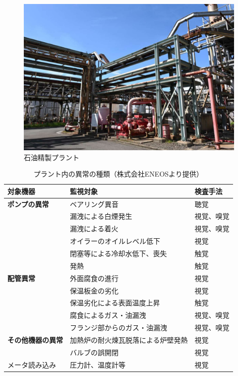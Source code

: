 \documentclass[../main]{subfiles}
\begin{document}
\begin{figure}[t]
  \centering
  \includegraphics[keepaspectratio, width=0.8\linewidth]{chap1/view_plant.png}
  \caption{石油精製プラント}
  \label{fig:view_plant}
\end{figure}


\begin{table}[t]
  \caption{プラント内の異常の種類（株式会社ENEOSより提供）}
  \label{tab:plant_anomalies}
  \centering
  \begin{tabular}{lll}
    \toprule
    対象機器 & 監視対象 & 検査手法 \\
    \midrule
    \textbf{ポンプの異常} & ベアリング異音 & 聴覚 \\
                 & 漏洩による白煙発生 & 視覚、嗅覚 \\
                 & 漏洩による着火 & 視覚、嗅覚 \\
                 & オイラーのオイルレベル低下 & 視覚 \\
                 & 閉塞等による冷却水低下、喪失 & 触覚 \\
                 & 発熱 & 触覚 \\
    \midrule
    \textbf{配管異常} & 外面腐食の進行 & 視覚 \\
               & 保温板金の劣化 & 視覚 \\
               & 保温劣化による表面温度上昇 & 触覚 \\
               & 腐食によるガス・油漏洩 & 視覚、嗅覚 \\
               & フランジ部からのガス・油漏洩 & 視覚、嗅覚 \\
    \midrule
    \textbf{その他機器の異常} & 加熱炉の耐火煉瓦脱落による炉壁発熱 & 視覚 \\
                   & バルブの誤開閉 & 視覚 \\
    \midrule
    メータ読み込み & 圧力計、温度計等 & 視覚 \\
    \bottomrule
  \end{tabular}
\end{table}
\end{document}
